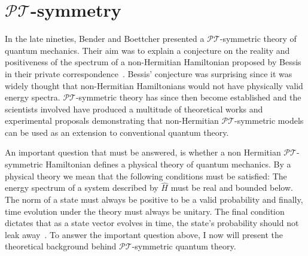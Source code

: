 \documentclass[12pt, a4paper]{report}
\newcommand\PT{\(\mathcal{PT}\)}
\begin{document}
\chapter{\texorpdfstring{$\mathcal{PT}$}\:-symmetry}\label{PT}
In the late nineties, Bender and Boettcher presented a \PT-symmetric theory of quantum mechanics. Their aim was to explain a conjecture on the reality and positiveness of the spectrum of a non-Hermitian Hamiltonian proposed by Bessis in their private correspondence~\cite{RealSpectrainNHH}. Bessis' conjecture was surprising since it was widely thought that non-Hermitian Hamiltonians would not have physically valid energy spectra. 
\PT-symmetric theory has since then become established and the scientists involved have produced a multitude of theoretical works and experimental proposals demonstrating that non-Hermitian \PT-symmetric models can be used as an extension to conventional quantum theory.

An important question that must be answered, is whether a non Hermitian \PT-symmetric Hamiltonian defines a physical theory of quantum mechanics. By a physical theory we mean that the following conditions must be satisfied: The energy spectrum of a system described by $\hat{H}$ must be real and bounded below. The norm of a state must always be positive to be a valid probability and finally, time evolution under the theory must always be unitary. The final condition dictates that as a state vector evolves in time, the state's probability should not leak away~\cite{MustaHbeHermitian,MakingSense}. To answer the important question above, I now will present the theoretical background behind \PT-symmetric quantum theory.  

\end{document}
